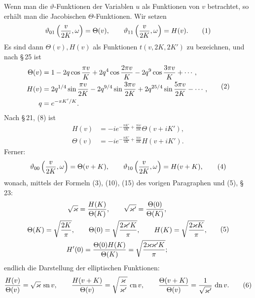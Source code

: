 \documentclass[11pt]{article}
\providecommand{\tht}{\vartheta}
\providecommand{\sn}{\operatorname{sn}}
\providecommand{\cn}{\operatorname{cn}}
\providecommand{\dn}{\operatorname{dn}}
\begin{document}
Wenn man die $\vartheta$-Funktionen der Variablen $u$ als Funktionen von $v$ betrachtet, so erhält man die Jacobischen $\Theta$-Funktionen. Wir setzen
\begin{equation}
\tht_{01}\left({v\over2K},\omega\right)=\Theta(v),
\qquad
\tht_{11}\left({v\over2K},\omega\right)=H(v).
\tag{1}
\end{equation}
Es sind dann $\Theta(v),H(v)$ als Funktionen $t(v,2K,2K')$ zu bezeichnen, und nach \S\,25 ist
\begin{equation}
\begin{aligned}
\Theta(v)&=1-2q\cos{\pi v\over K}+2q^4\cos{2\pi v\over K}-2q^9\cos{3\pi v\over K}+\cdots,\\
H(v)&=2q^{1/4}\sin{\pi v\over2K}-2q^{9/4}\sin{3\pi v\over2K}+2q^{25/4}\sin{5\pi v\over2K}-\cdots,\\
q&=e^{-\pi K'/K}.
\end{aligned}
\tag{2}
\end{equation}
Nach \S\,21, (8) ist
\begin{equation}
\begin{aligned}
H(v)&=-i e^{-\frac{\pi K'}{4K}+\frac{\pi i v}{2K}}\Theta(v+iK'),\\
\Theta(v)&=-i e^{-\frac{\pi K'}{4K}+\frac{\pi i v}{2K}}H(v+iK').
\end{aligned}
\tag{3}
\end{equation}
Ferner:
\begin{equation}
\tht_{00}\left({v\over2K},\omega\right)=\Theta(v+K),
\qquad
\tht_{10}\left({v\over2K},\omega\right)=H(v+K),
\tag{4}
\end{equation}
wonach, mittels der Formeln (3), (10), (15) des vorigen Paragraphen und (5), \S\,23:
\begin{equation}
\begin{gathered}
\sqrt\varkappa={H(K)\over\Theta(K)},
\qquad
\sqrt{\varkappa'}={\Theta(0)\over\Theta(K)},\\
\Theta(K)=\sqrt{2K\over\pi},
\qquad
\Theta(0)=\sqrt{2\varkappa'K\over\pi},
\qquad
H(K)=\sqrt{2\varkappa K\over\pi},\\
H'(0)={\Theta(0)H(K)\over\Theta(K)}=\sqrt{2\varkappa\varkappa'K\over\pi};
\end{gathered}
\tag{5}
\end{equation}
endlich die Darstellung der elliptischen Funktionen:
\begin{equation}
{H(v)\over\Theta(v)}=\sqrt\varkappa\,\sn v,
\qquad
{H(v+K)\over\Theta(v)}=\sqrt{\varkappa\over\varkappa'}\,\cn v,
\qquad
{\Theta(v+K)\over\Theta(v)}={1\over\sqrt{\varkappa'}}\,\dn v.
\tag{6}
\end{equation}
\end{document}
